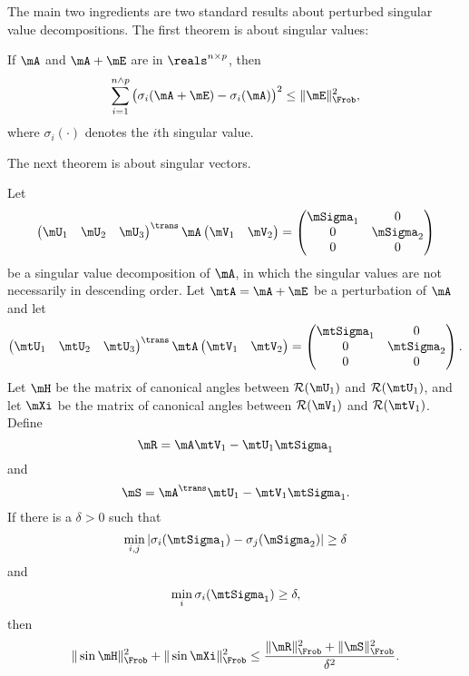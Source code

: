 The main two ingredients are two standard results about perturbed singular value decompositions.  The first theorem is about singular values:

\begin{theorem}[Mirsky]
    If $\mA$ and $\mA + \mE$ are in $\reals^{n \times p}$, then
    \[
        \sum_{i=1}^{n \wedge p}
            \big(
                \sigma_i(\mA + \mE)
                -
                \sigma_i(\mA)
            \big)^2
        \leq
        \| \mE \|_\Frob^2,
    \]
    where $\sigma_i(\cdot)$ denotes the $i$th singular value.
\end{theorem}

\noindent
The next theorem is about singular vectors.

\begin{theorem}[Wedin]
    Let
    \[
        \left(
        \begin{matrix}
            \mU_1 & \mU_2 & \mU_3
        \end{matrix}
        \right)^\trans
        \mA
        \left(
        \begin{matrix}
            \mV_1 & \mV_2
        \end{matrix}
        \right)
        =
        \left(
        \begin{matrix}
            \mSigma_1 & 0 \\
            0         & \mSigma_2 \\
            0         & 0
        \end{matrix}
        \right)
    \]
    be a singular value decomposition of $\mA$, in which the singular
    values are not necessarily in descending order.  Let $\mtA = \mA + \mE$
    be a perturbation of $\mA$ and let
    \[
        \left(
        \begin{matrix}
            \mtU_1 & \mtU_2 & \mtU_3
        \end{matrix}
        \right)^\trans
        \mtA
        \left(
        \begin{matrix}
            \mtV_1 & \mtV_2
        \end{matrix}
        \right)
        =
        \left(
        \begin{matrix}
            \mtSigma_1 & 0 \\
            0          & \mtSigma_2 \\
            0          & 0
        \end{matrix}
        \right).
    \]
    Let $\mH$ be the matrix of canonical angles between
    $\mathcal{R}(\mU_1)$ and $\mathcal{R}(\mtU_1)$, and let
    $\mXi$ be the matrix of canonical angles between
    $\mathcal{R}(\mV_1)$ and $\mathcal{R}(\mtV_1)$.  Define
    \[
        \mR = \mA \mtV_1 - \mtU_1 \mtSigma_1
    \]
    and
    \[
        \mS = \mA^\trans \mtU_1 - \mtV_1 \mtSigma_1.
    \]
    If there is a $\delta > 0$ such that
    \[
        \min_{i,j} 
            | \sigma_i( \mtSigma_1 ) - \sigma_j( \mSigma_2 )| 
        \geq 
        \delta
    \]
    and
    \[
        \min_i \sigma_i( \mtSigma_1 ) \geq \delta,
    \]
    then
    \[
        \| \sin \mH \|_\Frob^2 + \| \sin \mXi \|_\Frob^2
        \leq
        \frac{\| \mR \|_\Frob^2 + \| \mS \|_\Frob^2}{\delta^2}.
    \]
\end{theorem}


